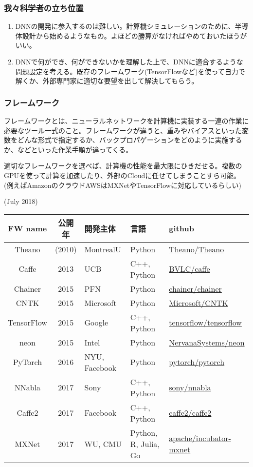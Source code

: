 \documentclass[11pt]{article}
\providecommand{\tightlist}{%
      \setlength{\itemsep}{0pt}\setlength{\parskip}{0pt}}
\begin{document}
\subsubsection{我々科学者の立ち位置}\label{ux6211ux3005ux79d1ux5b66ux8005ux306eux7acbux3061ux4f4dux7f6e}

\begin{enumerate}
\def\labelenumi{\arabic{enumi}.}
\tightlist
\item
  DNNの開発に参入するのは難しい。計算機シミュレーションのために、半導体設計から始めるようなもの。よほどの勝算がなければやめておいたほうがいい。
\item
  DNNで何ができ、何ができないかを理解した上で、DNNに適合するような問題設定を考える。既存のフレームワーク(TensorFlowなど)を使って自力で解くか、外部専門家に適切な要望を出して解決してもらう。
\end{enumerate}

\subsubsection{フレームワーク}\label{ux30d5ux30ecux30fcux30e0ux30efux30fcux30af}

フレームワークとは、ニューラルネットワークを計算機に実装する一連の作業に必要なツール一式のこと。フレームワークが違うと、重みやバイアスといった変数をどんな形式で指定するか、バックプロパゲーションをどのように実施するか、などといった作業手順が違ってくる。

適切なフレームワークを選べば、計算機の性能を最大限にひきだせる。複数のGPUを使って計算を加速したり、外部のCloudに任せてしまうことすら可能。(例えばAmazonのクラウドAWSはMXNetやTensorFlowに対応しているらしい)

(July 2018)

\begin{longtable}[]{@{}cclll@{}}
\toprule
FW name & 公開年 & 開発主体 & 言語 & github\tabularnewline
\midrule
\endhead
Theano & (2010) & MontrealU & Python &
\href{https://github.com/Theano/Theano}{Theano/Theano}\tabularnewline
Caffe & 2013 & UCB & C++, Python &
\href{https://github.com/BVLC/caffe}{BVLC/caffe}\tabularnewline
Chainer & 2015 & PFN & Python &
\href{https://github.com/chainer/chainer}{chainer/chainer}\tabularnewline
CNTK & 2015 & Microsoft & Python &
\href{https://github.com/Microsoft/CNTK}{Microsoft/CNTK}\tabularnewline
TensorFlow & 2015 & Google & C++, Python &
\href{https://github.com/tensorflow/tensorflow}{tensorflow/tensorflow}\tabularnewline
neon & 2015 & Intel & Python &
\href{https://github.com/NervanaSystems/neon}{NervanaSystems/neon}\tabularnewline
PyTorch & 2016 & NYU, Facebook & Python &
\href{https://github.com/pytorch/pytorch}{pytorch/pytorch}\tabularnewline
NNabla & 2017 & Sony & C++, Python &
\href{https://github.com/sony/nnabla}{sony/nnabla}\tabularnewline
Caffe2 & 2017 & Facebook & C++, Python &
\href{https://github.com/caffe2/caffe2}{caffe2/caffe2}\tabularnewline
MXNet & 2017 & WU, CMU & Python, R, Julia, Go &
\href{https://github.com/apache/incubator-mxnet}{apache/incubator-mxnet}\tabularnewline
\bottomrule
\end{longtable}
\end{document}
